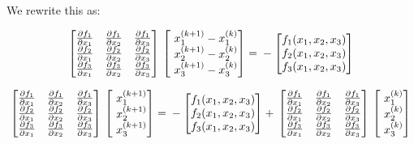 \documentclass[12pt]{article}
\renewcommand{\_}{\kern-1.5pt\textunderscore\kern-1.5pt}
\begin{document}
We rewrite this as:

$$ \begin{bmatrix}
\frac{\partial f_1}{\partial x_1}  & \frac{\partial f_1}{\partial x_2}  & \frac{\partial f_1}{\partial x_3} \\
\frac{\partial f_2}{\partial x_1}  & \frac{\partial f_2}{\partial x_2}  & \frac{\partial f_2}{\partial x_3} \\
\frac{\partial f_3}{\partial x_1}  & \frac{\partial f_3}{\partial x_2}  & \frac{\partial f_3}{\partial x_3} 
\end{bmatrix} \\ 
\begin{bmatrix}
\ x_1^{(k+1)} - x_1^{(k)} \\
\ x_2^{(k+1)} - x_2^{(k)}\\
\ x_3^{(k+1)} - x_3^{(k)}
\end{bmatrix} = \\
-\begin{bmatrix}
f_1 (x_1,x_2,x_3) \\
f_2 (x_1,x_2,x_3) \\
f_3 (x_1,x_2,x_3)
\end{bmatrix}
$$

$$ \begin{bmatrix}
\frac{\partial f_1}{\partial x_1}  & \frac{\partial f_1}{\partial x_2}  & \frac{\partial f_1}{\partial x_3} \\
\frac{\partial f_2}{\partial x_1}  & \frac{\partial f_2}{\partial x_2}  & \frac{\partial f_2}{\partial x_3} \\
\frac{\partial f_3}{\partial x_1}  & \frac{\partial f_3}{\partial x_2}  & \frac{\partial f_3}{\partial x_3} 
\end{bmatrix} \\ 
\begin{bmatrix}
\ x_1^{(k+1)}  \\
\ x_2^{(k+1)} \\
\ x_3^{(k+1)} 
\end{bmatrix} = \\
-\begin{bmatrix}
f_1 (x_1,x_2,x_3) \\
f_2 (x_1,x_2,x_3) \\
f_3 (x_1,x_2,x_3)
\end{bmatrix} + \\
\begin{bmatrix}
\frac{\partial f_1}{\partial x_1}  & \frac{\partial f_1}{\partial x_2}  & \frac{\partial f_1}{\partial x_3} \\
\frac{\partial f_2}{\partial x_1}  & \frac{\partial f_2}{\partial x_2}  & \frac{\partial f_2}{\partial x_3} \\
\frac{\partial f_3}{\partial x_1}  & \frac{\partial f_3}{\partial x_2}  & \frac{\partial f_3}{\partial x_3} 
\end{bmatrix} \\
\begin{bmatrix}
\ x_1^{(k)} \\
\ x_2^{(k)}\\
\ x_3^{(k)}
\end{bmatrix}
$$
\end{document}
